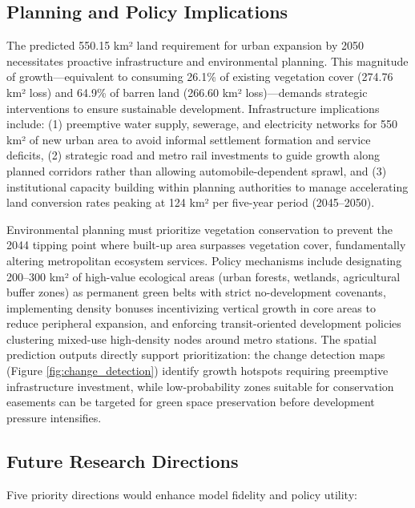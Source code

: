 \documentclass[12pt,a4paper]{article}
\begin{document}
\subsection{Planning and Policy Implications}

The predicted 550.15 km² land requirement for urban expansion by 2050 necessitates proactive infrastructure and environmental planning. This magnitude of growth—equivalent to consuming 26.1\% of existing vegetation cover (274.76 km² loss) and 64.9\% of barren land (266.60 km² loss)—demands strategic interventions to ensure sustainable development. Infrastructure implications include: (1) preemptive water supply, sewerage, and electricity networks for 550 km² of new urban area to avoid informal settlement formation and service deficits, (2) strategic road and metro rail investments to guide growth along planned corridors rather than allowing automobile-dependent sprawl, and (3) institutional capacity building within planning authorities to manage accelerating land conversion rates peaking at 124 km² per five-year period (2045--2050).

Environmental planning must prioritize vegetation conservation to prevent the 2044 tipping point where built-up area surpasses vegetation cover, fundamentally altering metropolitan ecosystem services. Policy mechanisms include designating 200--300 km² of high-value ecological areas (urban forests, wetlands, agricultural buffer zones) as permanent green belts with strict no-development covenants, implementing density bonuses incentivizing vertical growth in core areas to reduce peripheral expansion, and enforcing transit-oriented development policies clustering mixed-use high-density nodes around metro stations. The spatial prediction outputs directly support prioritization: the change detection maps (Figure \ref{fig:change_detection}) identify growth hotspots requiring preemptive infrastructure investment, while low-probability zones suitable for conservation easements can be targeted for green space preservation before development pressure intensifies.

\subsection{Future Research Directions}

Five priority directions would enhance model fidelity and policy utility:
\end{document}
